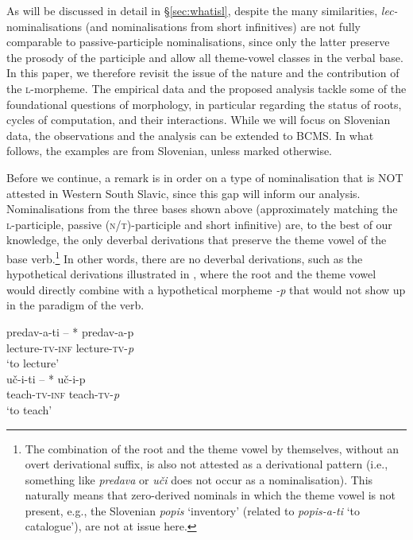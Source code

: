 \documentclass[output=paper,colorlinks,citecolor=brown]{langscibook}
\begin{document}
\noindent As will be discussed in detail in \S \ref{sec:whatisl}, despite the many similarities,  \textit{lec-}nomina\-li\-sa\-tions (and nominalisations from short infinitives) are not fully comparable to passive-participle nominalisations, since only the latter preserve the prosody of the participle and allow all theme-vowel classes in the verbal base. In this paper, we therefore revisit the issue of the nature and the contribution of the \textsc{l}-morpheme. The empirical data and the proposed analysis tackle some of the foundational questions of morphology, in particular regarding the status of roots, cycles of computation, and their interactions. While we will focus on Slovenian data, the observations and the analysis can be extended to BCMS. In what follows, the examples are from Slovenian, unless marked otherwise. 


Before we continue, a remark is in order on a type of nominalisation that is NOT attested in Western South Slavic, since this gap will inform our analysis. Nominalisations from the three bases shown above (approximately matching the \textsc{l}-participle, passive (\textsc{n/t})-participle and short infinitive) are, to the best of our knowledge, the only deverbal derivations that preserve the theme vowel of the base verb.\footnote{The combination of the root and the theme vowel by themselves, without an overt derivational suffix, is also not attested as a derivational pattern (i.e., something like \textit{predava} or \textit{uči} does not occur as a nominalisation). This naturally means that zero-derived nominals in which the theme vowel is not present, e.g., the Slovenian \textit{popis} `inventory' (related to \textit{popis-a-ti} `to catalogue'), are not at issue here.} In other words, there are no deverbal derivations, such as the hypothetical derivations illustrated in , where the root and the theme vowel would directly combine with a hypothetical morpheme \textit{-p} that would not show up in the paradigm of the verb. 
 

\ea \label{ex:predavap} \ea
\glll predav-a-ti -- *\hspace{-2pt} predav-a-p \\
        lecture-\textsc{tv}-\textsc{inf} {} {} lecture-\textsc{tv}-\textit{p} {} 
        \\
 {`to lecture'} {}  {} \\
\ex \label{ex:ucip}
\glll uč-i-ti -- *\hspace{-2pt} uč-i-p \\
        teach-\textsc{tv}-\textsc{inf} {} {} teach-\textsc{tv}-\textit{p} {} 
        \\
 {`to teach'} {} {} \\
\z
\z
\end{document}
